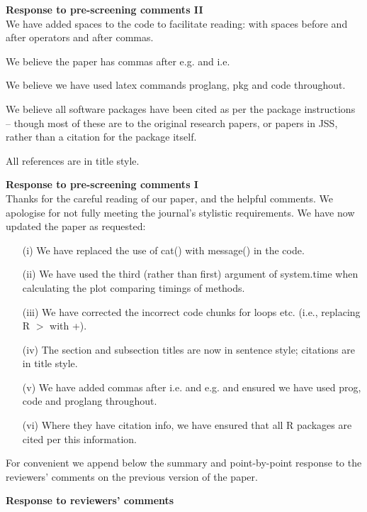 \documentclass[12pt]{article}
\begin{document}
\maketitle
\noindent
{\bf Response to pre-screening comments II }
\\

We have added spaces to the code to facilitate reading: with spaces before and after operators and after commas.

We believe the paper has commas after e.g. and i.e.

We believe we have used latex commands proglang, pkg and code throughout.

We believe all software packages have been cited as per the package instructions -- though most of these are to the original research papers, or papers in JSS, rather than a citation for the package itself.

All references are in title style.

\noindent
{\bf Response to pre-screening comments I }
\\

Thanks for the careful reading of our paper, and the helpful comments. We apologise for not fully meeting the journal's stylistic requirements. We have now updated the paper as requested:
\begin{itemize}
\item[(i)] We have replaced the use of cat() with message() in the code.
\item[(ii)] We have used the third (rather than first) argument of system.time when calculating the plot comparing timings of methods.
\item[(iii)] We have corrected the incorrect code chunks for loops etc. (i.e., replacing R $>$ with +).
\item[(iv)] The section and subsection titles are now in sentence style; citations are in title style.
\item[(v)] We have added commas after i.e. and e.g. and ensured we have used prog, code and proglang throughout.
\item[(vi)] Where they have citation info, we have ensured that all R packages are cited per this information.
\end{itemize}

For convenient we append below the summary and point-by-point response to the reviewers' comments on the previous version of the paper.

\pagebreak
\noindent
{\bf Response to reviewers' comments}
\\
\end{document}
